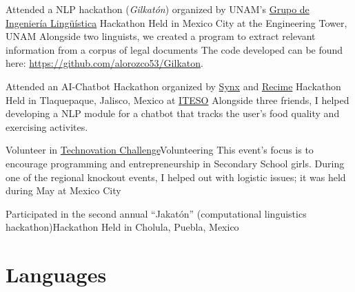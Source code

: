 \documentclass[10pt,a4paper,sans]{moderncv} %
\begin{document}
        {Attended a NLP hackathon (\emph{Gilkatón}) organized by UNAM's
          \href{http://grupos.iingen.unam.mx/iling/es-mx/Paginas/default.aspx}{Grupo de Ingeniería Lingüística}}
        {Hackathon}
        {Held in Mexico City at the Engineering Tower, UNAM}
        {Alongside two linguists, we created a program to extract relevant information
          from a corpus of legal documents}
        {The code developed can be found here: \url{https://github.com/alorozco53/Gilkaton}.}

        {Attended an AI-Chatbot Hackathon organized by \href{http://synx.co}{Synx} and \href{https://www.recime.io}{Recime}}
        {Hackathon}
        {Held in Tlaquepaque, Jalisco, Mexico at \href{http://www.iteso.mx}{ITESO}}{}
        {Alongside three friends, I helped developing a NLP module for a chatbot that tracks the user's food quality and exercising activites.}

        {Volunteer in \href{http://technovationmx.org}{Technovation Challenge}}{Volunteering}
        {This event's focus is to encourage programming and entrepreneurship in Secondary School girls. During one of the regional knockout events, I helped out with logistic issues; it was held during May at Mexico City}
        {}{}

        {Participated in the second annual ``Jakatón'' (computational linguistics hackathon)}{Hackathon}
        {Held in Cholula, Puebla, Mexico}{}{}




\section{Languages}


\end{document}
